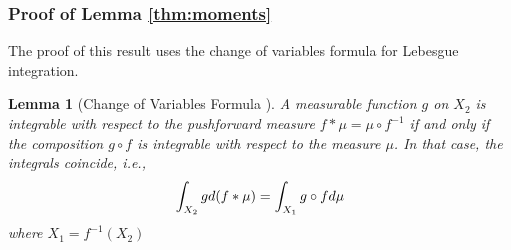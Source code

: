\documentclass{article}
\newtheorem{lemma}{Lemma}
\begin{document}
\subsubsection{Proof of Lemma \ref{thm:moments}}
\label{lemma3}
The proof of this result uses the change of variables formula for Lebesgue integration.
\begin{lemma}[Change of Variables Formula \cite{bogachev2007measure}]
    A measurable function $g$ on $X_2$ is integrable with respect to the pushforward measure $f*\mu = \mu \circ f^{-1}$ if and only if the composition $g \circ f$ is integrable with respect to the measure $\mu$. In that case, the integrals coincide, i.e.,
    \begin{equation}
        \int_{X_2} g \space d(f*\mu) = \int_{X_1} g\circ f \space d\mu
    \end{equation}
    where $X_1 = f^{-1}(X_2)$
\end{lemma}
\end{document}
